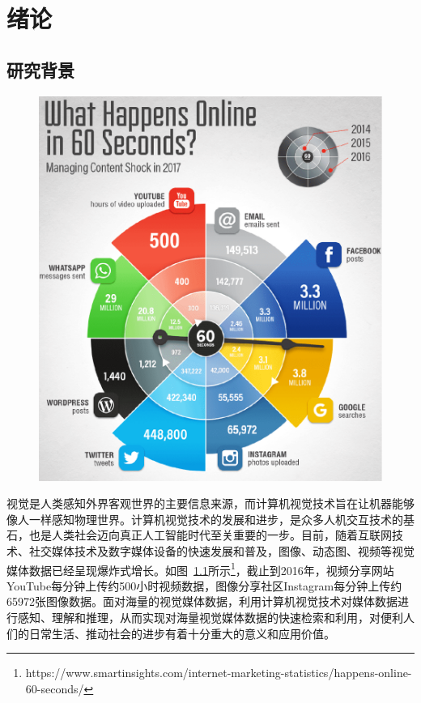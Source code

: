 \chapter{绪论}

\section{研究背景}

\begin{figure}
    \centering
        \includegraphics[width=0.95\linewidth]{chapter1/res/media_statistics.pdf}
    \label{ch1:fig:media_statistics}
\end{figure}

视觉是人类感知外界客观世界的主要信息来源，而计算机视觉技术旨在让机器能够像人一样感知物理世界。计算机视觉技术的发展和进步，是众多人机交互技术的基石，也是人类社会迈向真正人工智能时代至关重要的一步。目前，随着互联网技术、社交媒体技术及数字媒体设备的快速发展和普及，图像、动态图、视频等视觉媒体数据已经呈现爆炸式增长。如图~\ref{ch1:fig:media_statistics}所示\footnote{https://www.smartinsights.com/internet-marketing-statistics/happens-online-60-seconds/}，截止到2016年，视频分享网站YouTube每分钟上传约500小时视频数据，图像分享社区Instagram每分钟上传约65972张图像数据。面对海量的视觉媒体数据，利用计算机视觉技术对媒体数据进行感知、理解和推理，从而实现对海量视觉媒体数据的快速检索和利用，对便利人们的日常生活、推动社会的进步有着十分重大的意义和应用价值。

